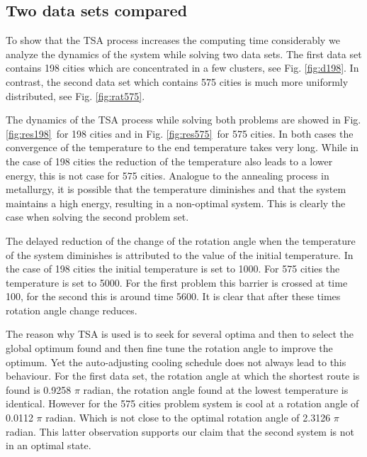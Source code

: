 

\subsection{Two data sets compared}
To show that the TSA process increases the computing time considerably we
analyze the dynamics of the system while solving two data sets. The first data
set contains 198 cities which are concentrated in a few clusters, see Fig.
\ref{fig:d198}. In contrast, the second data set which contains 575 cities is
much more uniformly distributed, see Fig. \ref{fig:rat575}.

The dynamics of the TSA process while solving both problems are showed in Fig.
\ref{fig:res198}~for 198 cities and in Fig. \ref{fig:res575}~for 575 cities.
In both cases the convergence of the temperature to the end temperature takes
very long. While in the case of 198 cities the reduction of the temperature
also leads to a lower energy, this is not case for 575 cities. Analogue to the
annealing process in metallurgy, it is possible that the temperature
diminishes and that the system maintains a high energy, resulting in a
non-optimal system. This is clearly the case when solving the second problem set.

The delayed reduction of the change of the rotation angle when the temperature
of the system diminishes is attributed to the value of the initial
temperature. In the case of 198 cities the initial temperature is set to 1000.
For 575 cities the temperature is set to 5000. For the first problem this
barrier is crossed at time 100, for the second this is around time 5600.  It
is clear that after these times rotation angle change reduces.

The reason why TSA is used is to seek for several optima and then to select
the global optimum found and then fine tune the rotation angle to improve the
optimum. Yet the auto-adjusting cooling schedule does not always lead to this
behaviour. For the first data set, the rotation angle at which the shortest
route is found is 0.9258 $\pi$ radian, the rotation angle found at the lowest
temperature is identical. However for the 575 cities problem system is cool at
a rotation angle of 0.0112 $\pi$ radian. Which is not close to the optimal rotation
angle of 2.3126 $\pi$ radian. This latter observation supports our claim that the
second system is not in an optimal state.

